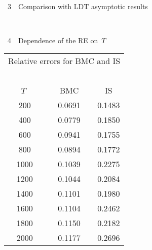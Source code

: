 \begin{multicols}{2}
{ \begin{center}  %
 \vspace*{3pt}
\mbox{%
\epsfxsize=76.527mm
}


\vspace*{1pt}


\noindent
{{\figurename~3}\ \ \small{Comparison with LDT asymptotic results}}
\end{center}
}

\vspace*{1pt}

{ \begin{center}  %
 \vspace*{3pt}
\mbox{%
\epsfxsize=77.933mm
}


\vspace*{1pt}


\noindent
{{\figurename~4}\ \ \small{Dependence of the RE on~$T$}}
\end{center}
}




{\small
\vspace*{-4.1pt}
\begin{center}

\begin{tabular}{|c|c|c|}
\multicolumn{3}{c}{Relative errors for BMC and IS}\\
\multicolumn{3}{c}{\ }\\[-6pt]
  \hline
 \ $T$ \ & \ \ BMC\  \ & IS \\
  \hline
  \hphantom{9}200 & 0.0691 & 0.1483 \\
     \hphantom{9}400 & 0.0779 & 0.1850 \\
     \hphantom{9}600 & 0.0941 & 0.1755 \\
     \hphantom{9}800 & 0.0894 & 0.1772 \\
   1000 & 0.1039 & 0.2275 \\
  1200 & 0.1044 & 0.2084 \\
 1400 & 0.1101 & 0.1980 \\
 1600 & 0.1104 & 0.2462 \\
 1800 & 0.1150 & 0.2182 \\
\ \ 2000\ \ & \ \ 0.1177\ \ & 0.2696 \\
   \hline
\end{tabular}
\end{center}}


\end{multicols}
